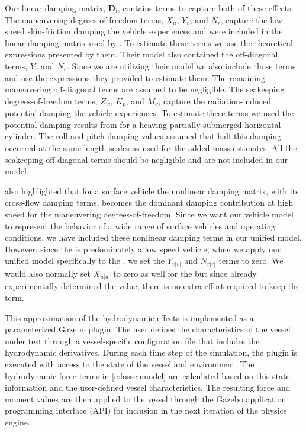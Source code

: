 \documentclass[utf8]{frontiersSCNS} %
\begin{document}
Our linear damping matrix, $\bm{D}_l$, contains terms to capture both of these effects. The maneuvering degrees-of-freedom terms, $X_{u}$, $Y_{v}$, and $N_{r}$, capture the low-speed skin-friction damping the vehicle experiences and were included in the linear damping matrix used by \citet{sarda16station}. To estimate these terms we use the theoretical expressions presented by them. Their model also contained the off-diagonal terms, $Y_{r}$ and $N_{v}$. Since we are utilizing their model we also include those terms and use the expressions they provided to estimate them. The remaining maneuvering off-diagonal terms are assumed to be negligible. The seakeeping degrees-of-freedom terms, $Z_{w}$, $K_{p}$, and $M_{q}$, capture the radiation-induced potential damping the vehicle experiences. To estimate these terms we used the potential damping results from \citet{greenhow88added} for a heaving partially submerged horizontal cylinder. The roll and pitch damping values assumed that half this damping occurred at the same length scales as used for the added mass estimates. All the seakeeping off-diagonal terms should be negligible and are not included in our model.

\citet{fossen11handbook} also highlighted that for a surface vehicle the nonlinear damping matrix, with its cross-flow damping terms, becomes the dominant damping contribution at high speed for the maneuvering degrees-of-freedom. Since we want our vehicle model to represent the behavior of a wide range of surface vehicles and operating conditions, we have included these nonlinear damping terms in our unified model. However, since the \wamv{} is predominately a low speed vehicle, when we apply our unified model specifically to the \wamv{}, we set the $Y_{v|v|}$ and $N_{r|r|}$ terms to zero. We would also normally set $X_{u|u|}$ to zero as well for the \wamv{} but since \citet{sarda16station} already experimentally determined the value, there is no extra effort required to keep the term.\color{black}

This approximation of the hydrodynamic effects is implemented as a parameterized Gazebo plugin.  The user defines the characteristics of the vessel under test through a vessel-specific configuration file that includes the hydrodynamic derivatives.  During each time step of the simulation, the plugin is executed with access to the state of the vessel and environment.  The hydrodynamic force terms in \eqref{e:fossenmodel} are calculated based on this state information and the user-defined vessel characteristics.  The resulting force and moment values are then applied to the vessel through the Gazebo application programming interface (API) for inclusion in the next iteration of the physics engine.
\end{document}
